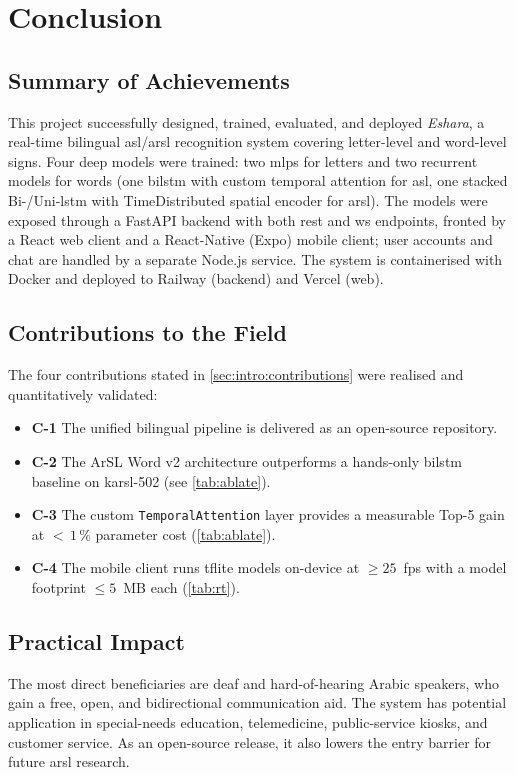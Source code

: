 \chapter{Conclusion}
\label{ch:conclusion}

\section{Summary of Achievements}
\label{sec:conc:ach}

This project successfully designed, trained, evaluated, and deployed
\emph{Eshara}, a real-time bilingual \gls{asl}/\gls{arsl} recognition
system covering letter-level and word-level signs. Four deep models were
trained: two \gls{mlp}s for letters and two recurrent models for words
(one \gls{bilstm} with custom temporal attention for \gls{asl},
one stacked Bi-/Uni-\gls{lstm} with TimeDistributed spatial encoder for
\gls{arsl}). The models were exposed through a FastAPI backend with
both \gls{rest} and \gls{ws} endpoints, fronted by a React web client and
a React-Native (Expo) mobile client; user accounts and chat are handled
by a separate Node.js service. The system is containerised with Docker
and deployed to Railway (backend) and Vercel (web).

\section{Contributions to the Field}
\label{sec:conc:contrib}

The four contributions stated in \cref{sec:intro:contributions} were
realised and quantitatively validated:
\begin{itemize}
  \item \textbf{C-1} The unified bilingual pipeline is delivered as
        an open-source repository.
  \item \textbf{C-2} The ArSL Word v2 architecture outperforms a
        hands-only \gls{bilstm} baseline on \gls{karsl}-502
        (see \cref{tab:ablate}).
  \item \textbf{C-3} The custom \texttt{TemporalAttention} layer
        provides a measurable Top-5 gain at $<\,1$\,\% parameter cost
        (\cref{tab:ablate}).
  \item \textbf{C-4} The mobile client runs \gls{tflite} models on-device
        at $\geq 25$~\gls{fps} with a model footprint $\leq 5$~MB each
        (\cref{tab:rt}).
\end{itemize}

\section{Practical Impact}
\label{sec:conc:impact}

The most direct beneficiaries are deaf and hard-of-hearing Arabic
speakers, who gain a free, open, and bidirectional communication aid.
The system has potential application in special-needs education,
telemedicine, public-service kiosks, and customer service. As an
open-source release, it also lowers the entry barrier for future
\gls{arsl} research.
